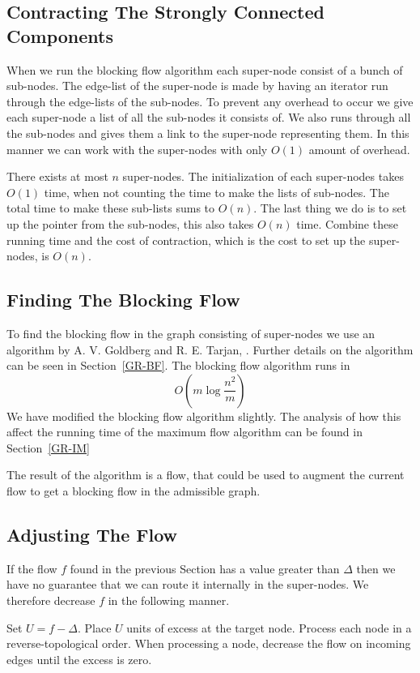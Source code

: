 \subsection{Contracting The Strongly Connected Components}
When we run the blocking flow algorithm each super-node consist of a bunch of sub-nodes. The edge-list of the super-node is made by
having an iterator run through the edge-lists of the sub-nodes. To prevent any overhead to occur we give each super-node a list of all the sub-nodes
it consists of. We also runs through all the sub-nodes and gives them a link to the super-node representing them. In this manner we can work
with the super-nodes with only $O(1)$ amount of overhead.

There exists at most $n$ super-nodes. The initialization of each super-nodes takes $O(1)$ time, when not counting the time to make the lists of sub-nodes.
The total time to make these sub-lists sums to $O(n)$. The last thing we do is to set up the pointer from the sub-nodes, this also takes $O(n)$ time.
Combine these running time and the cost of contraction, which is the cost to set up the super-nodes, is $O(n)$.

\subsection{Finding The Blocking Flow}
To find the blocking flow in the graph consisting of super-nodes we use an algorithm by  A. V. Goldberg and R. E. Tarjan, \cite{GoldbergTarjan1990}. 
Further details on the algorithm can be seen in Section~\ref{GR-BF}. 
The blocking flow algorithm runs in $$O(m\log{\frac{n^2}{m}})$$
We have modified the blocking flow algorithm slightly. The analysis of how this affect the running time of the maximum flow algorithm
can be found in Section~\ref{GR-IM}

The result of the algorithm is a flow, that could be used to augment the current flow to get a blocking flow in the admissible graph.

\subsection{Adjusting The Flow}
If the flow $f$ found in the previous Section has a value greater than $\Delta$ then we have no guarantee that we can route it internally in the super-nodes.
We therefore decrease $f$ in the following manner.

Set $U = f - \Delta$. Place $U$ units of excess at the target node. Process each node in a reverse-topological order. When 
processing a node, decrease the flow on incoming edges until the excess is zero.

